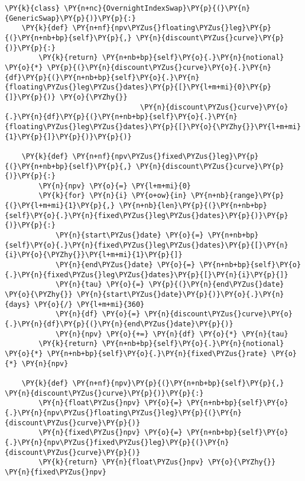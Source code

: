 \begin{codebox}[breakable, size=fbox, boxrule=1pt, pad at break*=1mm,colback=cellbackground, colframe=cellborder]
\begin{Verbatim}[commandchars=\\\{\}]
\PY{k}{class} \PY{n+nc}{OvernightIndexSwap}\PY{p}{(}\PY{n}{GenericSwap}\PY{p}{)}\PY{p}{:}
    \PY{k}{def} \PY{n+nf}{npv\PYZus{}floating\PYZus{}leg}\PY{p}{(}\PY{n+nb+bp}{self}\PY{p}{,} \PY{n}{discount\PYZus{}curve}\PY{p}{)}\PY{p}{:}
        \PY{k}{return} \PY{n+nb+bp}{self}\PY{o}{.}\PY{n}{notional} \PY{o}{*} \PY{p}{(}\PY{n}{discount\PYZus{}curve}\PY{o}{.}\PY{n}{df}\PY{p}{(}\PY{n+nb+bp}{self}\PY{o}{.}\PY{n}{floating\PYZus{}leg\PYZus{}dates}\PY{p}{[}\PY{l+m+mi}{0}\PY{p}{]}\PY{p}{)} \PY{o}{\PYZhy{}}
                                \PY{n}{discount\PYZus{}curve}\PY{o}{.}\PY{n}{df}\PY{p}{(}\PY{n+nb+bp}{self}\PY{o}{.}\PY{n}{floating\PYZus{}leg\PYZus{}dates}\PY{p}{[}\PY{o}{\PYZhy{}}\PY{l+m+mi}{1}\PY{p}{]}\PY{p}{)}\PY{p}{)}
	
    \PY{k}{def} \PY{n+nf}{npv\PYZus{}fixed\PYZus{}leg}\PY{p}{(}\PY{n+nb+bp}{self}\PY{p}{,} \PY{n}{discount\PYZus{}curve}\PY{p}{)}\PY{p}{:}
        \PY{n}{npv} \PY{o}{=} \PY{l+m+mi}{0}
        \PY{k}{for} \PY{n}{i} \PY{o+ow}{in} \PY{n+nb}{range}\PY{p}{(}\PY{l+m+mi}{1}\PY{p}{,} \PY{n+nb}{len}\PY{p}{(}\PY{n+nb+bp}{self}\PY{o}{.}\PY{n}{fixed\PYZus{}leg\PYZus{}dates}\PY{p}{)}\PY{p}{)}\PY{p}{:}
            \PY{n}{start\PYZus{}date} \PY{o}{=} \PY{n+nb+bp}{self}\PY{o}{.}\PY{n}{fixed\PYZus{}leg\PYZus{}dates}\PY{p}{[}\PY{n}{i}\PY{o}{\PYZhy{}}\PY{l+m+mi}{1}\PY{p}{]}
            \PY{n}{end\PYZus{}date} \PY{o}{=} \PY{n+nb+bp}{self}\PY{o}{.}\PY{n}{fixed\PYZus{}leg\PYZus{}dates}\PY{p}{[}\PY{n}{i}\PY{p}{]}
            \PY{n}{tau} \PY{o}{=} \PY{p}{(}\PY{n}{end\PYZus{}date} \PY{o}{\PYZhy{}} \PY{n}{start\PYZus{}date}\PY{p}{)}\PY{o}{.}\PY{n}{days} \PY{o}{/} \PY{l+m+mi}{360}
            \PY{n}{df} \PY{o}{=} \PY{n}{discount\PYZus{}curve}\PY{o}{.}\PY{n}{df}\PY{p}{(}\PY{n}{end\PYZus{}date}\PY{p}{)}
            \PY{n}{npv} \PY{o}{+=} \PY{n}{df} \PY{o}{*} \PY{n}{tau}
        \PY{k}{return} \PY{n+nb+bp}{self}\PY{o}{.}\PY{n}{notional} \PY{o}{*} \PY{n+nb+bp}{self}\PY{o}{.}\PY{n}{fixed\PYZus{}rate} \PY{o}{*} \PY{n}{npv}
	
    \PY{k}{def} \PY{n+nf}{npv}\PY{p}{(}\PY{n+nb+bp}{self}\PY{p}{,} \PY{n}{discount\PYZus{}curve}\PY{p}{)}\PY{p}{:}
        \PY{n}{float\PYZus{}npv} \PY{o}{=} \PY{n+nb+bp}{self}\PY{o}{.}\PY{n}{npv\PYZus{}floating\PYZus{}leg}\PY{p}{(}\PY{n}{discount\PYZus{}curve}\PY{p}{)}
        \PY{n}{fixed\PYZus{}npv} \PY{o}{=} \PY{n+nb+bp}{self}\PY{o}{.}\PY{n}{npv\PYZus{}fixed\PYZus{}leg}\PY{p}{(}\PY{n}{discount\PYZus{}curve}\PY{p}{)}
        \PY{k}{return} \PY{n}{float\PYZus{}npv} \PY{o}{\PYZhy{}} \PY{n}{fixed\PYZus{}npv}
	

\end{Verbatim}
\end{codebox}
